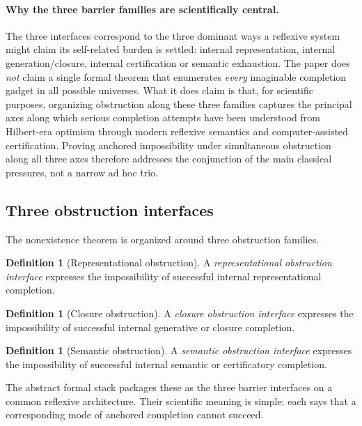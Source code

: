 \documentclass[11pt]{article}
\theoremstyle{plain}
\theoremstyle{definition}
\newtheorem{definition}[theorem]{Definition}
\theoremstyle{remark}
\begin{document}
\paragraph{Why the three barrier families are scientifically central.}
The three interfaces correspond to the three dominant ways a reflexive system might claim its self-related burden is settled: internal representation, internal generation/closure, internal certification or semantic exhaustion. The paper does \emph{not} claim a single formal theorem that enumerates \emph{every} imaginable completion gadget in all possible universes. What it does claim is that, for scientific purposes, organizing obstruction along these three families captures the principal axes along which serious completion attempts have been understood from Hilbert-era optimism through modern reflexive semantics and computer-assisted certification. Proving anchored impossibility under simultaneous obstruction along all three axes therefore addresses the conjunction of the main classical pressures, not a narrow ad hoc trio.

\subsection{Three obstruction interfaces}

The nonexistence theorem is organized around three obstruction families.

\begin{definition}[Representational obstruction]
A \emph{representational obstruction interface} expresses the impossibility of successful internal representational completion.
\end{definition}

\begin{definition}[Closure obstruction]
A \emph{closure obstruction interface} expresses the impossibility of successful internal generative or closure completion.
\end{definition}

\begin{definition}[Semantic obstruction]
A \emph{semantic obstruction interface} expresses the impossibility of successful internal semantic or certificatory completion.
\end{definition}

The abstract formal stack packages these as the three barrier interfaces on a common reflexive architecture. Their scientific meaning is simple: each says that a corresponding mode of anchored completion cannot succeed.
\end{document}
